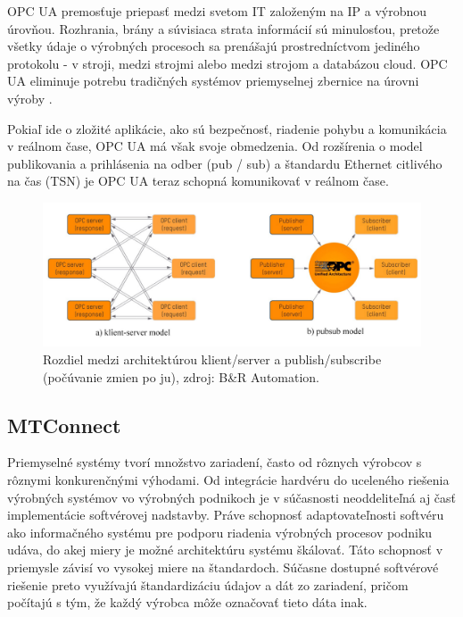 \documentclass[]{tukediphc}
\begin{document}
OPC UA premosťuje priepasť medzi svetom IT založeným na IP a výrobnou úrovňou. Rozhrania, brány a súvisiaca strata informácií sú minulosťou, pretože všetky údaje o výrobných procesoch sa prenášajú prostredníctvom jediného protokolu - v stroji, medzi strojmi alebo medzi strojom a databázou cloud. OPC UA eliminuje potrebu tradičných systémov priemyselnej zbernice na úrovni výroby \citep{brautomation}.


Pokiaľ ide o zložité aplikácie, ako sú bezpečnosť, riadenie pohybu a komunikácia v reálnom čase, OPC UA má však svoje obmedzenia. Od rozšírenia o model publikovania a prihlásenia na odber (pub / sub) a štandardu Ethernet citlivého na čas (TSN) je OPC UA teraz schopná komunikovať v reálnom čase.

\begin{figure}[h!]
	\centering
	\includegraphics[width=1\textwidth,angle=0]{figures/opc-ua-pubsub.jpg}
	\caption{Rozdiel medzi architektúrou klient/server a publish/subscribe (počúvanie zmien po ju), zdroj: B\&R Automation.}
\end{figure}

\subsection{MTConnect}

Priemyselné systémy tvorí množstvo zariadení, často od rôznych výrobcov s rôznymi konkurenčnými výhodami. Od integrácie hardvéru do uceleného riešenia výrobných systémov vo výrobných podnikoch je v súčasnosti neoddeliteľná aj časť implementácie softvérovej nadstavby. Práve schopnosť adaptovateľnosti softvéru ako informačného systému pre podporu riadenia výrobných procesov podniku udáva, do akej miery je možné architektúru systému škálovať. Táto schopnosť v priemysle závisí vo vysokej miere na štandardoch. Súčasne dostupné softvérové riešenie preto využívajú štandardizáciu údajov a dát zo zariadení, pričom počítajú s tým, že každý výrobca môže označovať tieto dáta inak.
\end{document}
